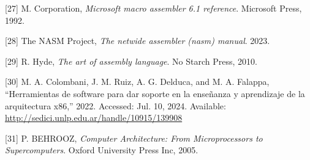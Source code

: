 \documentclass[12pt,twoside]{templates/unerthesis}
\newenvironment{cslreferences}%
  {}%
  {\par}
\begin{document}
\begin{cslreferences}
\leavevmode\hypertarget{ref-masm}{}%
{[}27{]} M. Corporation, \emph{Microsoft macro assembler 6.1 reference}. Microsoft Press, 1992.

\leavevmode\hypertarget{ref-nasm}{}%
{[}28{]} The NASM Project, \emph{The netwide assembler (nasm) manual}. 2023.

\leavevmode\hypertarget{ref-hyde2010art}{}%
{[}29{]} R. Hyde, \emph{The art of assembly language}. No Starch Press, 2010.

\leavevmode\hypertarget{ref-colombani_herramientas_2022}{}%
{[}30{]} M. A. Colombani, J. M. Ruiz, A. G. Delduca, and M. A. Falappa, ``Herramientas de software para dar soporte en la enseñanza y aprendizaje de la arquitectura x86,'' 2022. Accessed: Jul. 10, 2024. Available: \url{http://sedici.unlp.edu.ar/handle/10915/139908}

\leavevmode\hypertarget{ref-behrooz_computer_2005}{}%
{[}31{]} P. BEHROOZ, \emph{Computer Architecture: From Microprocessors to Supercomputers}. Oxford University Press Inc, 2005.
\end{cslreferences}




\end{document}
